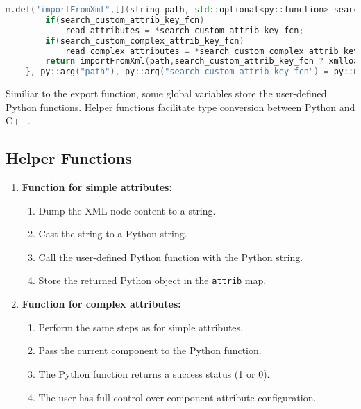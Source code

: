 \begin{lstlisting}[language=C++, xleftmargin=4em, frame = single]
m.def("importFromXml",[](string path, std::optional<py::function> search_custom_attrib_key_fcn = std::nullopt, std::optional<py::function> search_custom_complex_attrib_key_fcn = std::nullopt) {
        if(search_custom_attrib_key_fcn)
            read_attributes = *search_custom_attrib_key_fcn;
        if(search_custom_complex_attrib_key_fcn)
            read_complex_attributes = *search_custom_complex_attrib_key_fcn;
        return importFromXml(path,search_custom_attrib_key_fcn ? xmlloader : nullptr, search_custom_complex_attrib_key_fcn ? xmlloader_complex : nullptr );
    }, py::arg("path"), py::arg("search_custom_attrib_key_fcn") = py::none(), py::arg("search_custom_complex_attrib_key_fcn") = py::none());
\end{lstlisting}

Similiar to the export function, some global variables store the user-defined Python functions. Helper functions facilitate type conversion between Python and C++.

\subsection{Helper Functions}

\begin{enumerate}
    \item \textbf{Function for simple attributes:}
    \begin{enumerate}
        \item Dump the XML node content to a string.
        \item Cast the string to a Python string.
        \item Call the user-defined Python function with the Python string.
        \item Store the returned Python object in the \verb|attrib| map.
    \end{enumerate}
    \item \textbf{Function for complex attributes:}
    \begin{enumerate}
        \item Perform the same steps as for simple attributes.
        \item Pass the current component to the Python function.
        \item The Python function returns a success status (1 or 0).
        \item The user has full control over component attribute configuration.
    \end{enumerate}
\end{enumerate}
